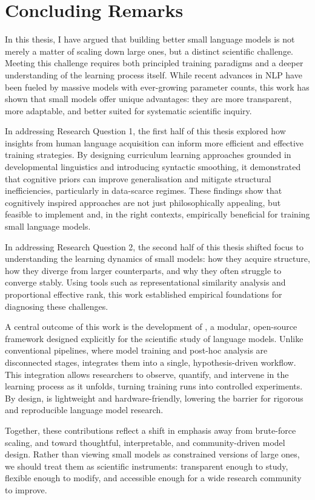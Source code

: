 \chapter{Concluding Remarks}
In this thesis, I have argued that building better small language models is not merely a matter of scaling down large ones, but a distinct scientific challenge. Meeting this challenge requires both principled training paradigms and a deeper understanding of the learning process itself. While recent advances in NLP have been fueled by massive models with ever-growing parameter counts, this work has shown that small models offer unique advantages: they are more transparent, more adaptable, and better suited for systematic scientific inquiry.

In addressing Research Question 1, the first half of this thesis explored how insights from human language acquisition can inform more efficient and effective training strategies. By designing curriculum learning approaches grounded in developmental linguistics and introducing syntactic smoothing, it demonstrated that cognitive priors can improve generalisation and mitigate structural inefficiencies, particularly in data-scarce regimes. These findings show that cognitively inspired approaches are not just philosophically appealing, but feasible to implement and, in the right contexts, empirically beneficial for training small language models.

In addressing Research Question 2, the second half of this thesis shifted focus to understanding the learning dynamics of small models: how they acquire structure, how they diverge from larger counterparts, and why they often struggle to converge stably. Using tools such as representational similarity analysis and proportional effective rank, this work established empirical foundations for diagnosing these challenges.

A central outcome of this work is the development of \pico, a modular, open-source framework designed explicitly for the scientific study of language models. Unlike conventional pipelines, where model training and post-hoc analysis are disconnected stages, \pico integrates them into a single, hypothesis-driven workflow. This integration allows researchers to observe, quantify, and intervene in the learning process as it unfolds, turning training runs into controlled experiments. By design, \pico is lightweight and hardware-friendly, lowering the barrier for rigorous and reproducible language model research.

Together, these contributions reflect a shift in emphasis away from brute-force scaling, and toward thoughtful, interpretable, and community-driven model design. Rather than viewing small models as constrained versions of large ones, we should treat them as scientific instruments: transparent enough to study, flexible enough to modify, and accessible enough for a wide research community to improve.